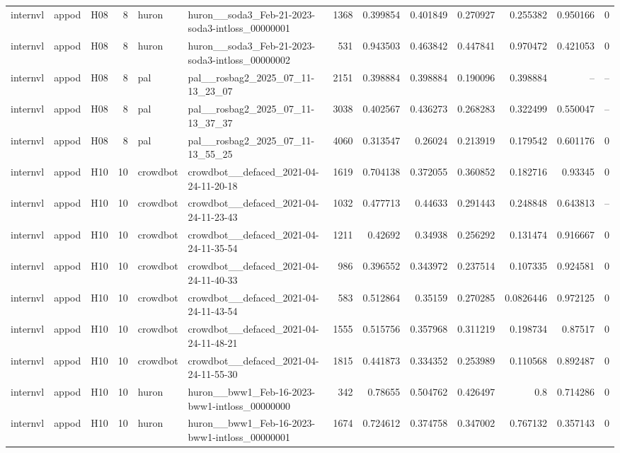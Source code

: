 \begin{longtable}{lllrllrrrrrrr}
internvl & appod & H08 & 8 & huron & huron\_\_soda3\_Feb-21-2023-soda3-intloss\_00000001 & 1368 & 0.399854 & 0.401849 & 0.270927 & 0.255382 & 0.950166 & 0 \\
internvl & appod & H08 & 8 & huron & huron\_\_soda3\_Feb-21-2023-soda3-intloss\_00000002 & 531 & 0.943503 & 0.463842 & 0.447841 & 0.970472 & 0.421053 & 0 \\
internvl & appod & H08 & 8 & pal & pal\_\_rosbag2\_2025\_07\_11-13\_23\_07 & 2151 & 0.398884 & 0.398884 & 0.190096 & 0.398884 & -- & -- \\
internvl & appod & H08 & 8 & pal & pal\_\_rosbag2\_2025\_07\_11-13\_37\_37 & 3038 & 0.402567 & 0.436273 & 0.268283 & 0.322499 & 0.550047 & -- \\
internvl & appod & H08 & 8 & pal & pal\_\_rosbag2\_2025\_07\_11-13\_55\_25 & 4060 & 0.313547 & 0.26024 & 0.213919 & 0.179542 & 0.601176 & 0 \\
internvl & appod & H10 & 10 & crowdbot & crowdbot\_\_defaced\_2021-04-24-11-20-18 & 1619 & 0.704138 & 0.372055 & 0.360852 & 0.182716 & 0.93345 & 0 \\
internvl & appod & H10 & 10 & crowdbot & crowdbot\_\_defaced\_2021-04-24-11-23-43 & 1032 & 0.477713 & 0.44633 & 0.291443 & 0.248848 & 0.643813 & -- \\
internvl & appod & H10 & 10 & crowdbot & crowdbot\_\_defaced\_2021-04-24-11-35-54 & 1211 & 0.42692 & 0.34938 & 0.256292 & 0.131474 & 0.916667 & 0 \\
internvl & appod & H10 & 10 & crowdbot & crowdbot\_\_defaced\_2021-04-24-11-40-33 & 986 & 0.396552 & 0.343972 & 0.237514 & 0.107335 & 0.924581 & 0 \\
internvl & appod & H10 & 10 & crowdbot & crowdbot\_\_defaced\_2021-04-24-11-43-54 & 583 & 0.512864 & 0.35159 & 0.270285 & 0.0826446 & 0.972125 & 0 \\
internvl & appod & H10 & 10 & crowdbot & crowdbot\_\_defaced\_2021-04-24-11-48-21 & 1555 & 0.515756 & 0.357968 & 0.311219 & 0.198734 & 0.87517 & 0 \\
internvl & appod & H10 & 10 & crowdbot & crowdbot\_\_defaced\_2021-04-24-11-55-30 & 1815 & 0.441873 & 0.334352 & 0.253989 & 0.110568 & 0.892487 & 0 \\
internvl & appod & H10 & 10 & huron & huron\_\_bww1\_Feb-16-2023-bww1-intloss\_00000000 & 342 & 0.78655 & 0.504762 & 0.426497 & 0.8 & 0.714286 & 0 \\
internvl & appod & H10 & 10 & huron & huron\_\_bww1\_Feb-16-2023-bww1-intloss\_00000001 & 1674 & 0.724612 & 0.374758 & 0.347002 & 0.767132 & 0.357143 & 0 \\

\end{longtable}
